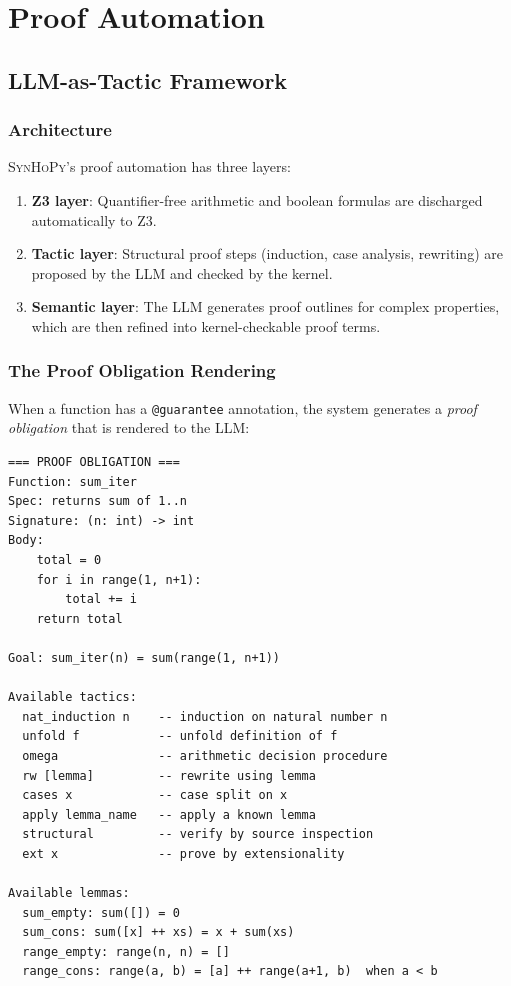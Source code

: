 \documentclass[11pt,a4paper]{report}
\theoremstyle{definition}
\theoremstyle{plain}
\newcommand{\synhopy}{\textsc{SynHoPy}}
\begin{document}

\part{Proof Automation}

\chapter{LLM-as-Tactic Framework}
\label{ch:llm-tactic}

\section{Architecture}

\synhopy{}'s proof automation has three layers:

\begin{enumerate}
  \item \textbf{Z3 layer}: Quantifier-free arithmetic and boolean formulas
    are discharged automatically to Z3.
  \item \textbf{Tactic layer}: Structural proof steps (induction, case analysis,
    rewriting) are proposed by the LLM and checked by the kernel.
  \item \textbf{Semantic layer}: The LLM generates proof outlines for complex
    properties, which are then refined into kernel-checkable proof terms.
\end{enumerate}

\section{The Proof Obligation Rendering}

When a function has a \lstinline[style=synhopy]{@guarantee} annotation, the system
generates a \emph{proof obligation} that is rendered to the LLM:

\begin{lstlisting}[style=proof]
=== PROOF OBLIGATION ===
Function: sum_iter
Spec: returns sum of 1..n
Signature: (n: int) -> int
Body:
    total = 0
    for i in range(1, n+1):
        total += i
    return total

Goal: sum_iter(n) = sum(range(1, n+1))

Available tactics:
  nat_induction n    -- induction on natural number n
  unfold f           -- unfold definition of f
  omega              -- arithmetic decision procedure
  rw [lemma]         -- rewrite using lemma
  cases x            -- case split on x
  apply lemma_name   -- apply a known lemma
  structural         -- verify by source inspection
  ext x              -- prove by extensionality

Available lemmas:
  sum_empty: sum([]) = 0
  sum_cons: sum([x] ++ xs) = x + sum(xs)
  range_empty: range(n, n) = []
  range_cons: range(a, b) = [a] ++ range(a+1, b)  when a < b
\end{lstlisting}
\end{document}
